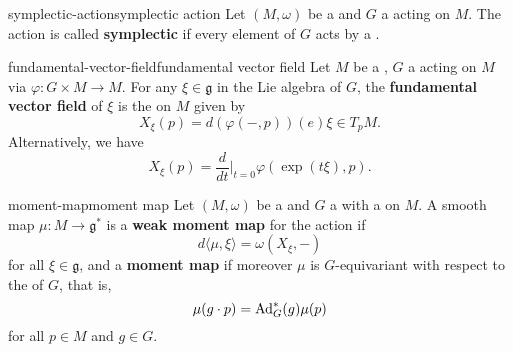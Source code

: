 \begin{topic}{symplectic-action}{symplectic action}
    Let $(M, \omega)$ be a  and $G$ a  acting on $M$. The action is called \textbf{symplectic} if every element of $G$ acts by a .
\end{topic}

\begin{topic}{fundamental-vector-field}{fundamental vector field}
    Let $M$ be a , $G$ a  acting on $M$ via $\varphi \colon G \times M \to M$. For any $\xi \in \mathfrak{g}$ in the Lie algebra of $G$, the \textbf{fundamental vector field} of $\xi$ is the  on $M$ given by
    \[ X_\xi(p) = d(\varphi(-, p))(e) \xi \in T_p M . \]
    Alternatively, we have
    \[ X_\xi(p) = \frac{d}{d t}\Big|_{t = 0} \varphi(\exp(t \xi), p) . \]
\end{topic}

\begin{topic}{moment-map}{moment map}
    Let $(M, \omega)$ be a  and $G$ a  with a  on $M$. A smooth map $\mu \colon M \to \mathfrak{g}^*$ is a \textbf{weak moment map} for the action if
    \[ d \langle \mu, \xi \rangle = \omega(X_\xi, -) \]
    for all $\xi \in \mathfrak{g}$, and a \textbf{moment map} if moreover $\mu$ is $G$-equivariant with respect to the  of $G$, that is,
    \[ \mu(g \cdot p) = \textup{Ad}_G^* (g) \mu(p) \]
    for all $p \in M$ and $g \in G$.
\end{topic}

